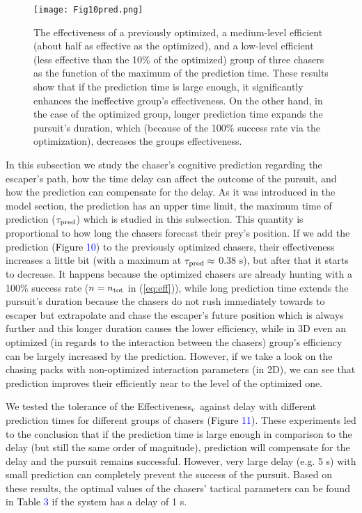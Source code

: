 \documentclass[12pt,a4paper,final]{iopart}
\newcommand{\revision}{\textcolor{black}}
\begin{document}
\begin{figure}[b]
\begin{center}
\texttt{[image: Fig10pred.png]}
\caption{The effectiveness of a previously optimized, a medium-level efficient (about half as effective as the optimized), and a low-level efficient (less effective than the 10\% of the optimized) group of three chasers as the function of the maximum of the prediction time. These results show that if the prediction time is large enough, it significantly enhances the ineffective group's effectiveness. On the other hand, in the case of the optimized group, longer prediction time expands the pursuit's duration, which (because of the 100\% success rate via the optimization), decreases the groups effectiveness.}
\label{fig:Fig9pred}
\end{center}
\end{figure} 

In this subsection we study the chaser's cognitive prediction regarding the escaper's path, how the time delay can affect the outcome of the pursuit, and how the prediction can compensate for the delay. As it was introduced in the model section, the prediction has an upper time limit, the maximum time of prediction ($\tau_{\rm pred}$) which is studied in this subsection. This quantity is proportional to how long the chasers forecast their prey's position. If we add the prediction (\revision{Figure} \textcolor{blue}{10}) to the previously optimized chasers, their effectiveness increases a little bit (with a maximum at $\tau_{\rm pred} \approx$ 0.38 s), but after that it starts to decrease. It happens because the optimized chasers are already hunting with a 100\% success rate ($n=n_{\rm tot}$ in (\ref{eq:eff})), while long prediction time extends the pursuit's duration because the chasers do not rush immediately towards to escaper but extrapolate and chase the escaper's future position which is always further and this longer duration causes the lower efficiency, while in 3D even an optimized (in regards to the interaction between the chasers) group's efficiency can be largely increased by the prediction. However, if we take a look on the chasing packs with non-optimized interaction parameters (in 2D), we can see that prediction improves their efficiently near to the level of the optimized one.


We tested the tolerance of the Effectiveness$_{\rm c}$ against delay with different prediction times for different groups of chasers (\revision{Figure} \textcolor{blue}{11}). These experiments led to the conclusion that if the prediction time is large enough in comparison to the delay (but still the same order of magnitude), prediction will compensate for the delay and the pursuit remains successful. However, very large delay (e.g. 5 s) with small prediction can completely prevent the success of the pursuit. Based on these results, the optimal values of the chasers' tactical parameters can be found in \revision{Table} \textcolor{blue}{3} if the system has a delay of 1 s.
\end{document}
